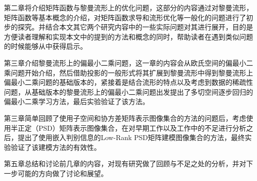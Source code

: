 第二章将介绍矩阵函数与黎曼流形上的优化问题，这部分的内容通过对黎曼流形，矩阵函数等基本概念的介绍，对矩阵函数求导和流形优化等一般化的问题进行了初步的探究。并结合本文其它两个研究内容中的一些实际问题对其进行展开，目的是方便读者理解和实现本文中的提到的方法和概念的同时，帮助读者在遇到类似问题的时候能够从中获得启示。

第三章介绍黎曼流形上的偏最小二乘问题，这一章的内容会从欧氏空间的偏最小二乘问题开始介绍，然后借助投影的一般形式将其扩展到黎曼流形中得到黎曼流形上偏最小二乘问题的基础版本的，紧接着是结合流形的特点以及考虑到数据的稀疏性问题，从基础版本的黎曼流形上的偏最小二乘问题出发提出了多切空间逐步回归的偏最小二乘学习方法，最后实验验证了该方法。

第三章简单回顾了使用子空间和协方差矩阵表示图像集合的方法的问题后，考虑使用半正定（PSD）矩阵表示图像集合，在对早期工作以及工作\cite{PSD_WACV}中的不足进行分析之后，提出了使用嵌入判别信息的Low-Rank PSD矩阵建模图像集合的方法，最终实验验证了该建模方法的有效性。

第五章总结和讨论前几章的内容，对现有研究做了回顾与不足之处的分析，并对下一步可能的方向做了讨论和展望。